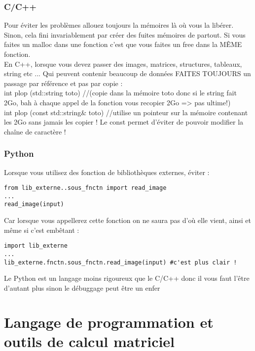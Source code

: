 \subsubsection*{C/C++}

Pour éviter les problèmes allouez toujours la mémoires là où vous la libérer. Sinon, cela
fini invariablement par créer des fuites mémoires de partout. Si vous faites 
un malloc dans une fonction c'est que vous faites un free dans la MÊME fonction. \\

En C++, lorsque vous devez passer des images, matrices, structures, tableaux, string  etc ... Qui 
peuvent contenir beaucoup de données FAITES TOUJOURS un passage par référence et pas par copie :\\

int plop (std::string toto) //(copie dans la mémoire toto donc si le string fait 2Go, bah à chaque
 appel de la fonction vous recopier 2Go => pas ultime!)\\

int plop (const std::string\& toto) //utilise un pointeur sur la mémoire contenant les 2Go sans
 jamais les copier ! Le const permet d'éviter de pouvoir modifier la chaîne de caractère !\\

\subsubsection*{Python}

Lorsque vous utilisez des fonction de bibliothèques externes, éviter : \\

\begin{lstlisting}[style=pythonsty]
from lib_externe..sous_fnctn import read_image
...
read_image(input)
\end{lstlisting}
Car lorsque vous appellerez cette fonction on ne saura pas d'où elle vient, ainsi et même si 
c'est embêtant : \\

\begin{lstlisting}[style=pythonsty]
import lib_externe
...
lib_externe.fnctn.sous_fnctn.read_image(input) #c'est plus clair !
\end{lstlisting}
Le Python est un langage moins rigoureux que le C/C++ donc il vous faut l'être d'autant plus
 sinon le débuggage peut être un enfer 




\section{Langage de programmation et outils de calcul matriciel}

